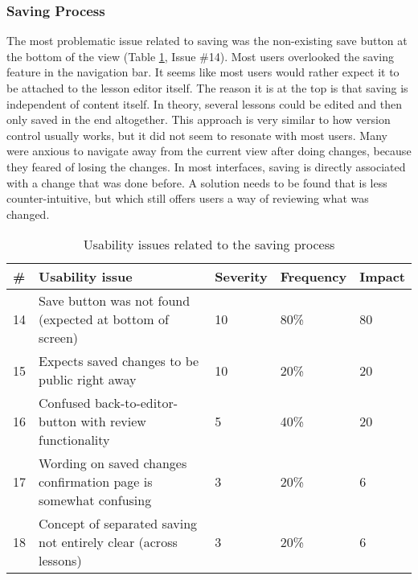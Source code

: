 \subsubsection{Saving Process}
The most problematic issue related to saving was the non-existing save button at the bottom of the view (Table \ref{table:issues-saving-process}, Issue \#14). Most users overlooked the saving feature in the navigation bar. It seems like most users would rather expect it to be attached to the lesson editor itself. The reason it is at the top is that saving is independent of content itself. In theory, several lessons could be edited and then only saved in the end altogether. This approach is very similar to how version control usually works, but it did not seem to resonate with most users. Many were anxious to navigate away from the current view after doing changes, because they feared of losing the changes. In most interfaces, saving is directly associated with a change that was done before. A solution needs to be found that is less counter-intuitive, but which still offers users a way of reviewing what was changed.

\begin{table}[h!]
\centering
\begin{tabular}{|l|p{7cm}|l|l|l|}
\hline
\rowcolor[HTML]{EFEFEF}
\textbf{\#} & \textbf{Usability issue} & \textbf{Severity} & \textbf{Frequency} & \textbf{Impact} \\ \hline
14 & Save button was not found (expected at bottom of screen) & 10 & 80\% & 80 \\ \hline
15 & Expects saved changes to be public right away & 10 & 20\% & 20 \\ \hline
16 & Confused back-to-editor-button with review functionality & 5 & 40\% & 20 \\ \hline
17 & Wording on saved changes confirmation page is somewhat confusing & 3 & 20\% & 6 \\ \hline
18 & Concept of separated saving not entirely clear (across lessons) & 3 & 20\% & 6 \\ \hline
\end{tabular}
\caption{Usability issues related to the saving process}
\label{table:issues-saving-process}
\end{table}

